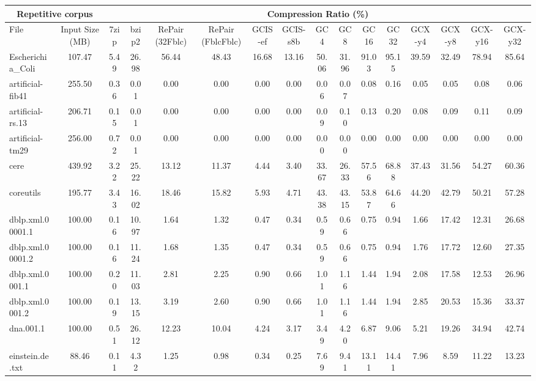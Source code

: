 \begin{table}[]
\centering
\begin{tabular}{|l|c|c|c|c|c|c|c|c|c|c|c|c|c|c|c|}
\hline
\multicolumn{2}{|c|}{Repetitive corpus} & \multicolumn{14}{c|}{Compression Ratio (\%)} \\
\hline
File & Input Size (MB) & 7zip & bzip2 & RePair (32Fblc) & RePair (FblcFblc) & GCIS-ef & GCIS-s8b & GC4 & GC8 & GC16 & GC32 & GCX-y4 & GCX-y8 & GCX-y16 & GCX-y32 \\
\hline
Escherichia\_Coli & 107.47 & 5.49 & 26.98 & 56.44 & 48.43 & 16.68 & 13.16 & 50.06 & 31.96 & 91.03 & 95.15 & 39.59 & 32.49 & 78.94 & 85.64 \\
\hline
artificial-fib41 & 255.50 & 0.36 & 0.01 & 0.00 & 0.00 & 0.00 & 0.00 & 0.06 & 0.07 & 0.08 & 0.16 & 0.05 & 0.05 & 0.08 & 0.06 \\
\hline
artificial-rs.13 & 206.71 & 0.15 & 0.01 & 0.00 & 0.00 & 0.00 & 0.00 & 0.09 & 0.10 & 0.13 & 0.20 & 0.08 & 0.09 & 0.11 & 0.09 \\
\hline
artificial-tm29 & 256.00 & 0.72 & 0.01 & 0.00 & 0.00 & 0.00 & 0.00 & 0.00 & 0.00 & 0.00 & 0.00 & 0.00 & 0.00 & 0.00 & 0.00 \\
\hline
cere & 439.92 & 3.22 & 25.22 & 13.12 & 11.37 & 4.44 & 3.40 & 33.67 & 26.33 & 57.56 & 68.88 & 37.43 & 31.56 & 54.27 & 60.36 \\
\hline
coreutils & 195.77 & 3.43 & 16.02 & 18.46 & 15.82 & 5.93 & 4.71 & 43.38 & 43.15 & 53.87 & 64.66 & 44.20 & 42.79 & 50.21 & 57.28 \\
\hline
dblp.xml.00001.1 & 100.00 & 0.16 & 10.97 & 1.64 & 1.32 & 0.47 & 0.34 & 0.59 & 0.66 & 0.75 & 0.94 & 1.66 & 17.42 & 12.31 & 26.68 \\
\hline
dblp.xml.00001.2 & 100.00 & 0.16 & 11.24 & 1.68 & 1.35 & 0.47 & 0.34 & 0.59 & 0.66 & 0.75 & 0.94 & 1.76 & 17.72 & 12.60 & 27.35 \\
\hline
dblp.xml.0001.1 & 100.00 & 0.20 & 11.03 & 2.81 & 2.25 & 0.90 & 0.66 & 1.01 & 1.16 & 1.44 & 1.94 & 2.08 & 17.58 & 12.53 & 26.96 \\
\hline
dblp.xml.0001.2 & 100.00 & 0.19 & 13.15 & 3.19 & 2.60 & 0.90 & 0.66 & 1.01 & 1.16 & 1.44 & 1.94 & 2.85 & 20.53 & 15.36 & 33.37 \\
\hline
dna.001.1 & 100.00 & 0.51 & 26.12 & 12.23 & 10.04 & 4.24 & 3.17 & 3.49 & 4.20 & 6.87 & 9.06 & 5.21 & 19.26 & 34.94 & 42.74 \\
\hline
einstein.de.txt & 88.46 & 0.11 & 4.32 & 1.25 & 0.98 & 0.34 & 0.25 & 7.69 & 9.41 & 13.11 & 14.41 & 7.96 & 8.59 & 11.22 & 13.23 \\

\end{tabular}
\end{table}
